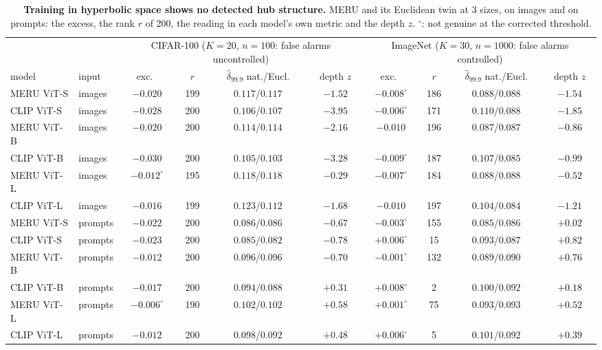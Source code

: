 \begin{table}[H]
\centering
\scriptsize
\setlength{\tabcolsep}{2.2pt}
\begin{tabular}{llcccc@{\hspace{8pt}}cccc}
\toprule
 & & \multicolumn{4}{c}{CIFAR-100 ($K{=}20$, $n{=}100$: false alarms uncontrolled)} & \multicolumn{4}{c}{ImageNet ($K{=}30$, $n{=}1000$: false alarms controlled)} \\
\cmidrule(lr){3-6}\cmidrule(lr){7-10}
model & input & exc.\ & $r$ & $\hat\delta_{99.9}$ nat./Eucl. & depth $z$ & exc.\ & $r$ & $\hat\delta_{99.9}$ nat./Eucl. & depth $z$ \\
\midrule
MERU ViT-S & images & $-0.020$ & 199 & $0.117$/$0.117$ & $-1.52$ & $-0.008^{\circ}$ & 186 & $0.088$/$0.088$ & $-1.54$ \\
CLIP ViT-S & images & $-0.028$ & 200 & $0.106$/$0.107$ & $-3.95$ & $-0.006^{\circ}$ & 171 & $0.110$/$0.088$ & $-1.85$ \\
MERU ViT-B & images & $-0.020$ & 200 & $0.114$/$0.114$ & $-2.16$ & $-0.010$ & 196 & $0.087$/$0.087$ & $-0.86$ \\
CLIP ViT-B & images & $-0.030$ & 200 & $0.105$/$0.103$ & $-3.28$ & $-0.009^{\circ}$ & 187 & $0.107$/$0.085$ & $-0.99$ \\
MERU ViT-L & images & $-0.012^{\circ}$ & 195 & $0.118$/$0.118$ & $-0.29$ & $-0.007^{\circ}$ & 184 & $0.088$/$0.088$ & $-0.52$ \\
CLIP ViT-L & images & $-0.016$ & 199 & $0.123$/$0.112$ & $-1.68$ & $-0.010$ & 197 & $0.104$/$0.084$ & $-1.21$ \\
\midrule
MERU ViT-S & prompts & $-0.022$ & 200 & $0.086$/$0.086$ & $-0.67$ & $-0.003^{\circ}$ & 155 & $0.085$/$0.086$ & $+0.02$ \\
CLIP ViT-S & prompts & $-0.023$ & 200 & $0.085$/$0.082$ & $-0.78$ & $+0.006^{\circ}$ & 15 & $0.093$/$0.087$ & $+0.82$ \\
MERU ViT-B & prompts & $-0.012$ & 200 & $0.096$/$0.096$ & $-0.70$ & $-0.001^{\circ}$ & 132 & $0.089$/$0.090$ & $+0.76$ \\
CLIP ViT-B & prompts & $-0.017$ & 200 & $0.094$/$0.088$ & $+0.31$ & $+0.008^{\circ}$ & 2 & $0.100$/$0.092$ & $+0.18$ \\
MERU ViT-L & prompts & $-0.006^{\circ}$ & 190 & $0.102$/$0.102$ & $+0.58$ & $+0.001^{\circ}$ & 75 & $0.093$/$0.093$ & $+0.52$ \\
CLIP ViT-L & prompts & $-0.012$ & 200 & $0.098$/$0.092$ & $+0.48$ & $+0.006^{\circ}$ & 5 & $0.101$/$0.092$ & $+0.39$ \\
\bottomrule
\end{tabular}
\par\vspace{2pt}
\caption{\textbf{Training in hyperbolic space shows no detected hub structure.} MERU and its Euclidean twin at 3 sizes, on images and on prompts: the excess, the rank $r$ of 200, the reading in each model's own metric and the depth $z$. $^{\circ}$: not genuine at the corrected threshold.
}
\label{tab:q4-depth-c}
\end{table}
